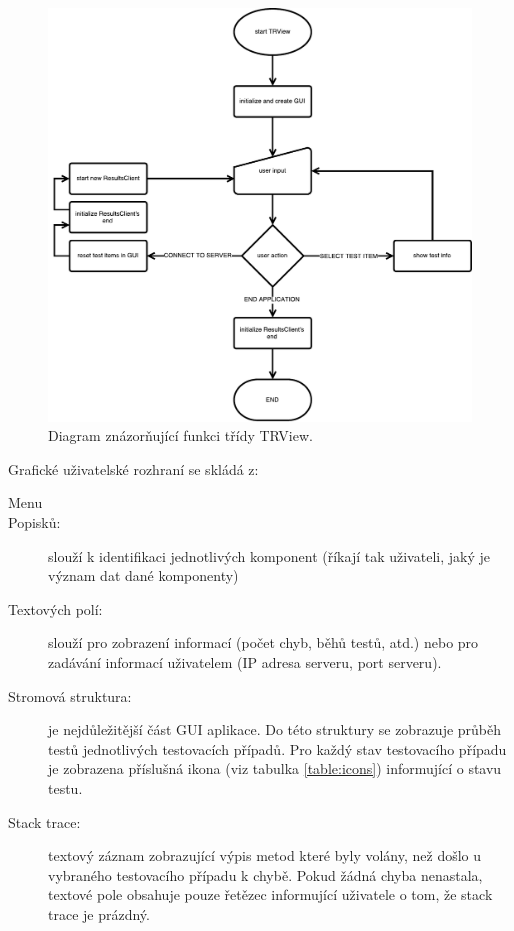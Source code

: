       \begin{figure}
	\includegraphics[width=\textwidth, height=\textheight, keepaspectratio, center]{obrazky-figures/trview_trview_flowchart.pdf}
	\caption{Diagram znázorňující funkci třídy TRView.}
	\label{fig:trview_flowchart}
      \end{figure}


      \noindent Grafické uživatelské rozhraní se skládá z:
      \begin{description}
	 \item[Menu] 
	 \item[Popisků:] slouží k identifikaci jednotlivých komponent (říkají tak uživateli, jaký je význam dat dané komponenty)
	 \item[Textových polí:] slouží pro zobrazení informací (počet chyb, běhů testů, atd.) nebo pro zadávání informací uživatelem (IP adresa serveru, port serveru).
	 \item[Stromová struktura:] je nejdůležitější část GUI aplikace. Do této struktury se zobrazuje průběh testů jednotlivých testovacích případů. Pro každý stav testovacího případu je zobrazena příslušná ikona (viz tabulka \ref{table:icons}) informující o stavu testu.
	 \item[Stack trace:] textový záznam zobrazující výpis metod které byly volány, než došlo u vybraného testovacího případu k chybě. Pokud žádná chyba nenastala, textové pole obsahuje pouze řetězec informující uživatele o tom, že stack trace je prázdný.
      \end{description}
      
